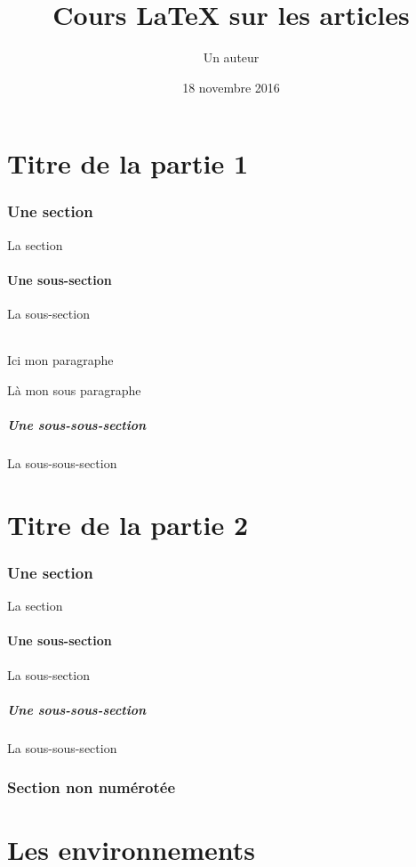 \documentclass[francais, 10pt]{article}
\title{Cours LaTeX sur les articles}
\author{Un auteur}
\date{18 novembre 2016}
\begin{document}
\maketitle

\tableofcontents


\part{Titre de la partie 1}
	\section{Une section}
		La section
		\subsection{Une sous-section}
			La sous-section
				\paragraph{}
					Ici mon paragraphe
					\subparagraph{}
						Là mon sous paragraphe
				\subsubsection{Une sous-sous-section}
				La sous-sous-section

\part{Titre de la partie 2}
	\section{Une section}
		La section
		\subsection{Une sous-section}
			La sous-section
			\subsubsection{Une sous-sous-section}
				La sous-sous-section
	\section*{Section non numérotée}

\part{Les environnements}
\end{document}
